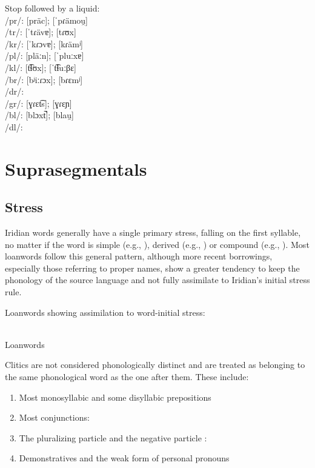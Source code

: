 \pex
\a Stop followed by a liquid:\\
/pr/:  [pr\"ac];  [ˈpɾämou̯]\\
/tr/:  [ˈtɾävɐ];  [tɾʊx]\\
/kr/:  [ˈkɾɔvɐ];  [kɾämʲ]\\
/pl/:  [pläːn];  [ˈpluːxɐ]\\
/kl/:  [t͡ɬʊx];  [ˈt͡ɬuːβɛ]\\
/br/:  [bʲiːɾɔx];  [bɾɛmʲ]\\
/dr/: \\
/gr/:  [ɣɾɛt͡s];  [ɣɾɛɲ]\\
/bl/:  [blɔxt̚];  [blau̯]\\
/dl/:
\xe

\section{Suprasegmentals}

\subsection{Stress}
Iridian words generally have a single primary stress, falling on the first syllable, no matter if the word is simple (e.g., ), derived (e.g., ) or compound (e.g., ). Most loanwords follow this general pattern, although more recent borrowings, especially those referring to proper names, show a greater tendency to keep the phonology of the source language and not fully assimilate to Iridian's initial stress rule.

\pex
\a Loanwords showing assimilation to word-initial stress:\\
\\

\a Loanwords
\xe

Clitics are not considered phonologically distinct and are treated as belonging to the same phonological word as the one after them. These include:

\begin{enumerate}[noitemsep,label=(\alph*)]
	\item Most monosyllabic and some disyllabic prepositions
	\item Most conjunctions:
	\item The pluralizing particle  and the negative particle : 
	\item Demonstratives and the weak form of personal pronouns
\end{enumerate}

